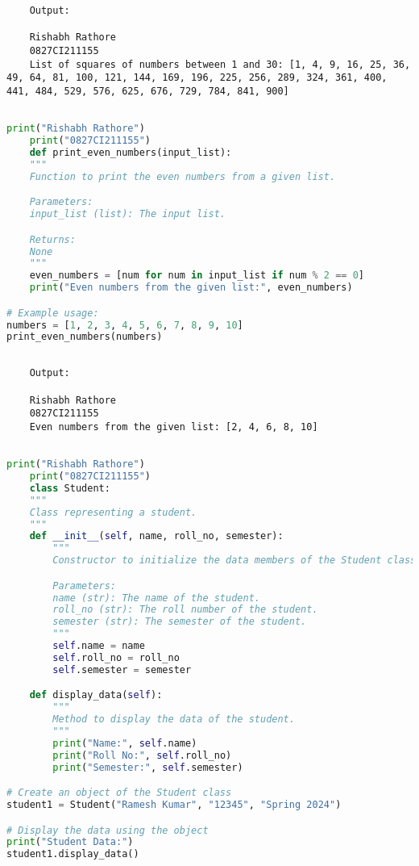 \documentclass{report}
\begin{document}
\begin{verbatim}
	Output:

	Rishabh Rathore
	0827CI211155
	List of squares of numbers between 1 and 30: [1, 4, 9, 16, 25, 36, 49, 64, 81, 100, 121, 144, 169, 196, 225, 256, 289, 324, 361, 400, 441, 484, 529, 576, 625, 676, 729, 784, 841, 900]
	

\end{verbatim}

\newpage


\sol 
\begin{lstlisting}[language=Python]
	print("Rishabh Rathore")
	print("0827CI211155")
	def print_even_numbers(input_list):
    """
    Function to print the even numbers from a given list.

    Parameters:
    input_list (list): The input list.

    Returns:
    None
    """
    even_numbers = [num for num in input_list if num % 2 == 0]
    print("Even numbers from the given list:", even_numbers)

# Example usage:
numbers = [1, 2, 3, 4, 5, 6, 7, 8, 9, 10]
print_even_numbers(numbers)
  

\end{lstlisting}

\begin{verbatim}
	Output:

	Rishabh Rathore
	0827CI211155
	Even numbers from the given list: [2, 4, 6, 8, 10]
	

\end{verbatim}

\newpage


\sol 
\begin{lstlisting}[language=Python]
	print("Rishabh Rathore")
	print("0827CI211155")
	class Student:
    """
    Class representing a student.
    """
    def __init__(self, name, roll_no, semester):
        """
        Constructor to initialize the data members of the Student class.

        Parameters:
        name (str): The name of the student.
        roll_no (str): The roll number of the student.
        semester (str): The semester of the student.
        """
        self.name = name
        self.roll_no = roll_no
        self.semester = semester

    def display_data(self):
        """
        Method to display the data of the student.
        """
        print("Name:", self.name)
        print("Roll No:", self.roll_no)
        print("Semester:", self.semester)

# Create an object of the Student class
student1 = Student("Ramesh Kumar", "12345", "Spring 2024")

# Display the data using the object
print("Student Data:")
student1.display_data()

\end{lstlisting}
\end{document}
